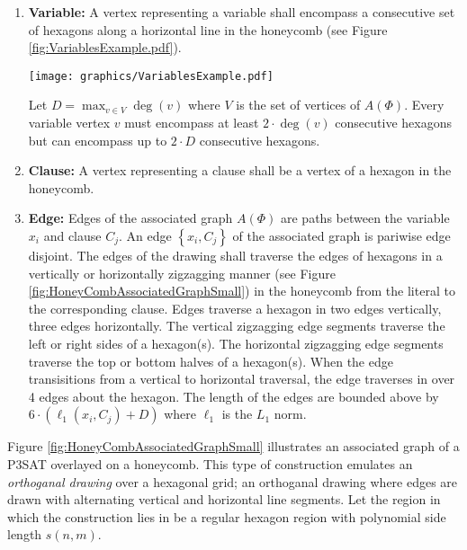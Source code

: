 \documentclass[10pt]{CSUNthesis}
\theoremstyle{plain}%
\theoremstyle{definition}
\theoremstyle{remark}
\newcommand{\lr}[1]{\left( #1 \right)}
\begin{document}
\begin{enumerate}
\item \textbf{Variable:} A vertex representing a variable shall encompass a consecutive set of hexagons along a horizontal line in the honeycomb (see Figure \ref{fig:VariablesExample.pdf}).

\begin{minipage}{\linewidth}
\begin{center}
\texttt{[image: graphics/VariablesExample.pdf]}
\label{fig:VariablesExample.pdf}
\end{center}
\end{minipage}

Let $D = \max_{v \in V} \deg(v)$ where $V$ is the set of vertices of $A(\Phi)$.
Every variable vertex $v$  must encompass at least $2 \cdot \deg(v)$ consecutive hexagons but can encompass up to $2 \cdot D$ consecutive hexagons.
\item \textbf{Clause:} A vertex representing a clause shall be a vertex of a hexagon in the honeycomb.
\item \textbf{Edge:} Edges of the associated graph $A(\Phi)$ are paths between the variable $x_i$ and clause $C_j$.  An edge $\left\lbrace x_i, C_j \right\rbrace$ of the associated graph is pariwise edge disjoint. 
The edges of the drawing shall traverse the edges of hexagons in a vertically or horizontally zigzagging manner (see Figure \ref{fig:HoneyCombAssociatedGraphSmall}) in the honeycomb from the literal to the corresponding clause. 
Edges traverse a hexagon in two edges vertically, three edges horizontally.  
The vertical zigzagging edge segments traverse the left or right sides of a hexagon(s).
The horizontal zigzagging edge segments traverse the top or bottom halves of a hexagon(s).
When the edge transisitions from a vertical to horizontal traversal, the edge traverses in over 4 edges about the hexagon.
The length of the edges are bounded above by $6 \cdot \lr{\ell_1 \lr{x_i,C_j} + D}$ where $\ell_1$ is the $L_1$ norm. 
\end{enumerate}

Figure \ref{fig:HoneyCombAssociatedGraphSmall} illustrates an associated graph of a P3SAT overlayed on a honeycomb.
This type of construction emulates an \textit{orthoganal drawing} over a hexagonal grid; an orthoganal drawing where edges are drawn with alternating vertical and horizontal line segments.
Let the region in which the construction lies in be a regular hexagon region with polynomial side length $s(n,m)$. 
\end{document}
